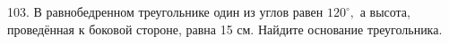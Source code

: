 103. В равнобедренном треугольнике один из углов равен $120^\circ,$ а высота, проведённая к боковой стороне, равна 15 см. Найдите основание треугольника.\\
